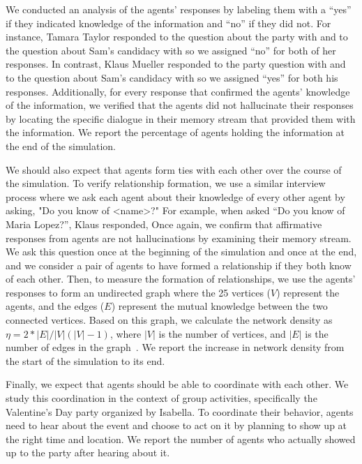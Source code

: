 We conducted an analysis of the agents' responses by labeling them with a ``yes'' if they indicated knowledge of the information and ``no'' if they did not. For instance, Tamara Taylor responded to the question about the party with  and to the question about Sam's candidacy with  so we assigned ``no'' for both of her responses. In contrast, Klaus Mueller responded to the party question with  and to the question about Sam's candidacy with  so we assigned ``yes'' for both his responses. Additionally, for every response that confirmed the agents' knowledge of the information, we verified that the agents did not hallucinate their responses by locating the specific dialogue in their memory stream that provided them with the information. We report the percentage of agents holding the information at the end of the simulation.

We should also expect that agents form ties with each other over the course of the simulation. To verify relationship formation, we use a similar interview process where we ask each agent about their knowledge of every other agent by asking, "Do you know of <name>?" For example, when asked ``Do you know of Maria Lopez?'', Klaus responded,  Once again, we confirm that affirmative responses from agents are not hallucinations by examining their memory stream. We ask this question once at the beginning of the simulation and once at the end, and we consider a pair of agents to have formed a relationship if they both know of each other. Then, to measure the formation of relationships, we use the agents' responses to form an undirected graph where the 25 vertices ($V$) represent the agents, and the edges ($E$) represent the mutual knowledge between the two connected vertices. Based on this graph, we calculate the network density as $\eta = 2 * |E| / |V| (|V| - 1)$, where $|V|$ is the number of vertices, and $|E|$ is the number of edges in the graph~\cite{77_Ackland2013How}. We report the increase in network density from the start of the simulation to its end.

Finally, we expect that agents should be able to coordinate with each other. We study this coordination in the context of group activities, specifically the Valentine's Day party organized by Isabella. To coordinate their behavior, agents need to hear about the event and choose to act on it by planning to show up at the right time and location. We report the number of agents who actually showed up to the party after hearing about it.

